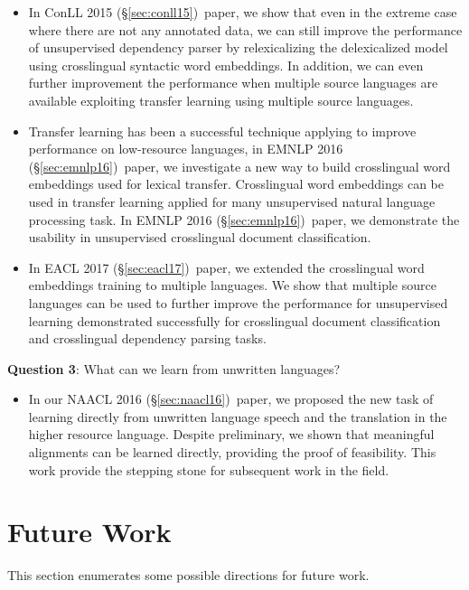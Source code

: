 \documentclass[12pt,twoside,final,hidelinks]{ltthesis}
\theoremstyle{definition}
\newcommand\conllv{ConLL 2015 (\S\ref{sec:conll15})}
\newcommand\naaclvi{NAACL 2016 (\S\ref{sec:naacl16})}
\newcommand\emnlpvi{EMNLP 2016 (\S\ref{sec:emnlp16})}
\newcommand\eaclvii{EACL 2017 (\S\ref{sec:eacl17})}
\begin{document}
\begin{itemize}
\item In \conllv\ paper, we show that even in the extreme case where there are not any annotated data, we can still improve the performance of unsupervised dependency parser by relexicalizing the 
delexicalized model using crosslingual syntactic word embeddings. In addition, we can even further improvement the performance when multiple source languages are available exploiting transfer learning using multiple source languages. 
\item Transfer learning has been a successful technique applying to improve performance on low-resource languages, in \emnlpvi\ paper, we investigate a new way to build crosslingual word embeddings used for lexical transfer. Crosslingual word embeddings can be used in transfer learning applied for many unsupervised natural 
language processing task. In \emnlpvi\ paper, we demonstrate the usability in unsupervised crosslingual document classification. 

\item In \eaclvii\ paper, we extended the crosslingual word embeddings training to multiple languages. We show that multiple source languages can be used to further improve the performance for unsupervised learning demonstrated successfully for crosslingual document classification and crosslingual dependency parsing tasks.  
\end{itemize}

\textbf{Question 3}: What can we learn from unwritten languages?
\begin{itemize}
\item In our \naaclvi\ paper, we proposed the new task of learning directly from unwritten language speech and the translation in the higher resource language. Despite preliminary, we shown that meaningful alignments can be learned directly, providing the proof of feasibility. This work provide the stepping stone for 
subsequent work in the field. %
\end{itemize}

\section{Future Work}
\label{sec:futurework}
This section enumerates some possible directions for future work. 
\end{document}
